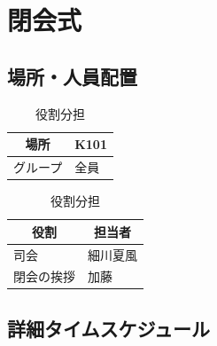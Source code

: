 \newpage
\section{閉会式}  %

\subsection{場所・人員配置}
\begin{table}[h]
  \centering
  \begin{minipage}[t]{0.48\columnwidth}
    \centering
    \caption{場所・該当グループ}
    \begin{tabular}{cl}
      \hline
      場所 & K101 \\
      \hline
      グループ & 全員 \\
      \hline
    \end{tabular}
  \end{minipage}
  \begin{minipage}[t]{0.48\columnwidth}
    \centering
    \caption{役割分担}
    \begin{tabular}{ll}
      \hline
      \multicolumn{1}{c}{役割} & \multicolumn{1}{c}{担当者} \\
      \hline
      司会 & 細川夏風 \\
      閉会の挨拶 & 加藤 \\
      \hline
    \end{tabular}
  \end{minipage}
\end{table}

\subsection{詳細タイムスケジュール}
\vspace{0.5em}
\fontsize{8pt}{12pt}\selectfont

